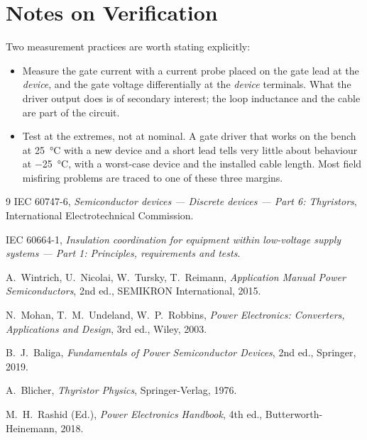 \documentclass[11pt,a4paper]{article}
\begin{document}
\section*{Notes on Verification}

Two measurement practices are worth stating explicitly:

\begin{itemize}
  \item Measure the gate current with a current probe placed on the gate lead at
        the \emph{device}, and the gate voltage differentially at the \emph{device}
        terminals. What the driver output does is of secondary interest; the loop
        inductance and the cable are part of the circuit.
  \item Test at the extremes, not at nominal. A gate driver that works on the bench
        at \SI{25}{\celsius} with a new device and a short lead tells very little
        about behaviour at \SI{-25}{\celsius}, with a worst-case device and the
        installed cable length. Most field misfiring problems are traced to one of
        these three margins.
\end{itemize}

\begin{thebibliography}{9}
 IEC 60747-6, \emph{Semiconductor devices --- Discrete devices
--- Part 6: Thyristors}, International Electrotechnical Commission.

 IEC 60664-1, \emph{Insulation coordination for equipment within
low-voltage supply systems --- Part 1: Principles, requirements and tests}.

 A.~Wintrich, U.~Nicolai, W.~Tursky, T.~Reimann,
\emph{Application Manual Power Semiconductors}, 2nd ed., SEMIKRON International,
2015.

 N.~Mohan, T.~M.~Undeland, W.~P.~Robbins, \emph{Power Electronics:
Converters, Applications and Design}, 3rd ed., Wiley, 2003.

 B.~J.~Baliga, \emph{Fundamentals of Power Semiconductor Devices},
2nd ed., Springer, 2019.

 A.~Blicher, \emph{Thyristor Physics}, Springer-Verlag, 1976.

 M.~H.~Rashid (Ed.), \emph{Power Electronics Handbook}, 4th ed.,
Butterworth-Heinemann, 2018.
\end{thebibliography}
\end{document}
